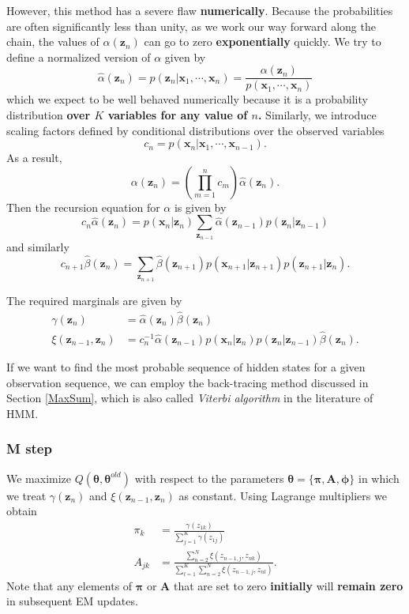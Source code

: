 \documentclass[a4paper]{report}
\renewcommand{\bf}{\mathbf}
\newcommand{\imp}[1]{{\color{blue}\textit{#1}}}
\newcommand{\bs}{\boldsymbol}
\begin{document}
However, this method has a severe flaw \textbf{numerically}. Because the probabilities are often significantly less than unity, as we work our way forward along the chain, the values of $\alpha(\bf{z}_n)$ can go to zero \textbf{exponentially} quickly. We try to define a normalized version of $\alpha$ given by
\begin{equation}
	\hat{\alpha}(\bf{z}_n) = p(\bf{z}_n|\bf{x}_1,\cdots,\bf{x}_n)=\frac{\alpha(\bf{z}_n)}{p(\bf{x}_1,\cdots,\bf{x}_n)}
\end{equation}
which we expect to be well behaved numerically because it is a probability distribution \textbf{over $K$ variables for any value of $n$.} Similarly, we introduce scaling factors defined by conditional distributions over the observed variables
\begin{equation}
	c_n = p(\bf{x}_n|\bf{x}_1,\cdots,\bf{x}_{n-1}).
\end{equation}
As a result,
\begin{equation}
	\alpha(\bf{z}_n) = \left( \prod_{m=1}^n c_m \right) \hat{\alpha}(\bf{z}_n).
\end{equation}
Then the recursion equation for $\alpha$ is given by
\begin{equation}
	c_n \hat{\alpha}(\bf{z}_n) = p(\bf{x}_n|\bf{z}_n)\sum_{\bf{z}_{n-1}} \hat{\alpha}(\bf{z}_{n-1})p(\bf{z}_n|\bf{z}_{n-1})
\end{equation}
and similarly
\begin{equation}
	c_{n+1}\hat{\beta}(\bf{z}_n) = \sum_{\bf{z}_{n+1}} \hat{\beta}(\bf{z}_{n+1})p(\bf{x}_{n+1}|\bf{z}_{n+1})p(\bf{z}_{n+1}|\bf{z}_n).
\end{equation}

The required marginals are given by
\begin{align}
	\gamma(\bf{z}_n) &= \hat{\alpha}(\bf{z}_n) \hat{\beta}(\bf{z}_n) \\
	\xi(\bf{z}_{n-1},\bf{z}_n) &= c_n^{-1} \hat{\alpha}(\bf{z}_{n-1})p(\bf{x}_n|\bf{z}_n)p(\bf{z}_n|\bf{z}_{n-1})\hat{\beta}(\bf{z}_n).
\end{align}

If we want to find the most probable sequence of hidden states for a given observation sequence, we can employ the back-tracing method discussed in Section \ref{MaxSum}, which is also called \imp{Viterbi algorithm} in the literature of HMM.

\subsubsection{M step}
We maximize $Q(\bs{\theta},\bs{\theta}^{old})$ with respect to the parameters $\bs{\theta}=\{\bs{\pi},\bf{A},\bs{\phi} \}$ in which we treat $\gamma(\bf{z}_n)$ and $\xi(\bf{z}_{n-1},\bf{z}_n)$ as constant. Using Lagrange multipliers we obtain
\begin{align}
	\pi_k &= \frac{\gamma(z_{1k})}{\sum_{j=1}^K \gamma(z_{1j})} \\
	A_{jk} &= \frac{\sum_{n=2}^N \xi(z_{n-1,j},z_{nk})}{\sum_{l=1}^K\sum_{n=2}^N \xi(z_{n-1,j},z_{nl})}.
\end{align}
Note that any elements of $\bs{\pi}$ or $\bf{A}$ that are set to zero \textbf{initially} will \textbf{remain zero} in subsequent EM updates.
\end{document}
